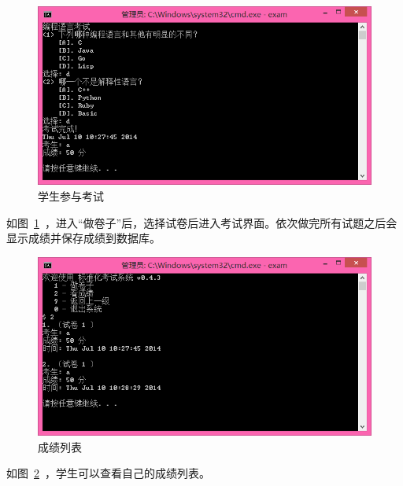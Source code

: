 \begin{figure}[htp]
\includegraphics[width=\textwidth]{image/student_test.png}
\caption{\label{student_test}学生参与考试}
\end{figure}

如图~\ref{student_test}~，进入“做卷子”后，选择试卷后进入考试界面。依次做完所有试题之后会显示成绩并保存成绩到数据库。

\begin{figure}[htp]
\includegraphics[width=\textwidth]{image/student_score.png}
\caption{\label{student_score}成绩列表}
\end{figure}

如图~\ref{student_score}~，学生可以查看自己的成绩列表。

